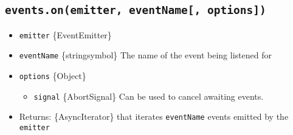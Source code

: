 \begin{Shaded}
\begin{Highlighting}[]
\NormalTok{ \{ }\OperatorTok{,}\OperatorTok{=} \NormalTok{(}\NormalTok{)}\OperatorTok{;}

\OperatorTok{=}  \NormalTok{()}\OperatorTok{;}
\NormalTok{(}\OperatorTok{,}\NormalTok{ () }\KeywordTok{=\textgreater{}}\NormalTok{ \{\})}\OperatorTok{;}
\NormalTok{(}\OperatorTok{,}\NormalTok{ () }\KeywordTok{=\textgreater{}}\NormalTok{ \{\})}\OperatorTok{;}
\NormalTok{(}\OperatorTok{,} \NormalTok{))}\OperatorTok{;}
\end{Highlighting}
\end{Shaded}

\subsection{\texorpdfstring{\texttt{events.on(emitter,\ eventName{[},\ options{]})}}{events.on(emitter, eventName{[}, options{]})}}\label{events.onemitter-eventname-options}

\begin{itemize}
\tightlist
\item
  \texttt{emitter} \{EventEmitter\}
\item
  \texttt{eventName} \{string\textbar symbol\} The name of the event
  being listened for
\item
  \texttt{options} \{Object\}

  \begin{itemize}
  \tightlist
  \item
    \texttt{signal} \{AbortSignal\} Can be used to cancel awaiting
    events.
  \end{itemize}
\item
  Returns: \{AsyncIterator\} that iterates \texttt{eventName} events
  emitted by the \texttt{emitter}
\end{itemize}

